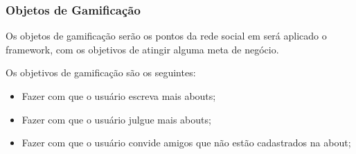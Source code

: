 \subsubsection{Objetos de Gamificação}
\label{sec:objetodegamificacao}
Os objetos de gamificação serão os pontos da rede social em será aplicado o framework,
com os objetivos de atingir alguma meta de negócio.

Os objetivos de gamificação são os seguintes:

\begin{itemize}
    \item Fazer com que o usuário escreva mais abouts;
    \item Fazer com que o usuário julgue mais abouts;
    \item Fazer com que o usuário convide amigos que não estão cadastrados na about;
\end{itemize}

